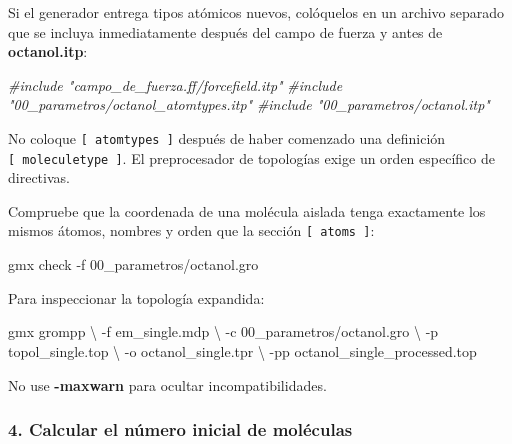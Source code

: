 \documentclass[
  spanish,
  11pt,
  a4paper]{article}
\newenvironment{Shaded}{\begin{snugshade}}{\end{snugshade}}
\newcommand{\AttributeTok}[1]{\textcolor[rgb]{0.13,0.29,0.53}{#1}}
\newcommand{\CommentTok}[1]{\textcolor[rgb]{0.56,0.35,0.01}{\textit{#1}}}
\newcommand{\DataTypeTok}[1]{\textcolor[rgb]{0.13,0.29,0.53}{#1}}
\newcommand{\ExtensionTok}[1]{#1}
\newcommand{\NormalTok}[1]{#1}
\begin{document}
Si el generador entrega tipos atómicos nuevos, colóquelos en un archivo
separado que se incluya inmediatamente después del campo de fuerza y
antes de \textbf{octanol.itp}:

\begin{Shaded}
\begin{Highlighting}[]
\CommentTok{\#include "campo\_de\_fuerza.ff/forcefield.itp"}
\CommentTok{\#include "00\_parametros/octanol\_atomtypes.itp"}
\CommentTok{\#include "00\_parametros/octanol.itp"}
\end{Highlighting}
\end{Shaded}

No coloque \texttt{{[}\ atomtypes\ {]}} después de haber comenzado una
definición \texttt{{[}\ moleculetype\ {]}}. El preprocesador de
topologías exige un orden específico de directivas.

Compruebe que la coordenada de una molécula aislada tenga exactamente
los mismos átomos, nombres y orden que la sección
\texttt{{[}\ atoms\ {]}}:

\begin{Shaded}
\begin{Highlighting}[]
\ExtensionTok{gmx}\NormalTok{ check }\AttributeTok{{-}f}\NormalTok{ 00\_parametros/octanol.gro}
\end{Highlighting}
\end{Shaded}

Para inspeccionar la topología expandida:

\begin{Shaded}
\begin{Highlighting}[]
\ExtensionTok{gmx}\NormalTok{ grompp }\DataTypeTok{\textbackslash{}}
    \AttributeTok{{-}f}\NormalTok{ em\_single.mdp }\DataTypeTok{\textbackslash{}}
    \AttributeTok{{-}c}\NormalTok{ 00\_parametros/octanol.gro }\DataTypeTok{\textbackslash{}}
    \AttributeTok{{-}p}\NormalTok{ topol\_single.top }\DataTypeTok{\textbackslash{}}
    \AttributeTok{{-}o}\NormalTok{ octanol\_single.tpr }\DataTypeTok{\textbackslash{}}
    \AttributeTok{{-}pp}\NormalTok{ octanol\_single\_processed.top}
\end{Highlighting}
\end{Shaded}

No use \textbf{-maxwarn} para ocultar incompatibilidades.

\subsubsection{4. Calcular el número inicial de
moléculas}\label{calcular-el-nuxfamero-inicial-de-moluxe9culas}
\end{document}
